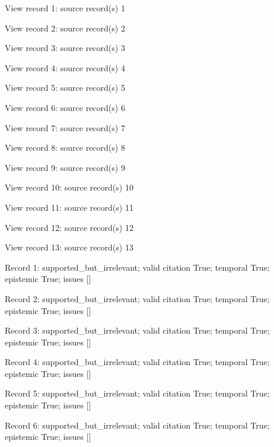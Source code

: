 View record 1: source record(s) 1\par

View record 2: source record(s) 2\par

View record 3: source record(s) 3\par

View record 4: source record(s) 4\par

View record 5: source record(s) 5\par

View record 6: source record(s) 6\par

View record 7: source record(s) 7\par

View record 8: source record(s) 8\par

View record 9: source record(s) 9\par

View record 10: source record(s) 10\par

View record 11: source record(s) 11\par

View record 12: source record(s) 12\par

View record 13: source record(s) 13\par

Record 1: supported\_but\_irrelevant; valid citation True; temporal True; epistemic True; issues []\par

Record 2: supported\_but\_irrelevant; valid citation True; temporal True; epistemic True; issues []\par

Record 3: supported\_but\_irrelevant; valid citation True; temporal True; epistemic True; issues []\par

Record 4: supported\_but\_irrelevant; valid citation True; temporal True; epistemic True; issues []\par

Record 5: supported\_but\_irrelevant; valid citation True; temporal True; epistemic True; issues []\par

Record 6: supported\_but\_irrelevant; valid citation True; temporal True; epistemic True; issues []\par

